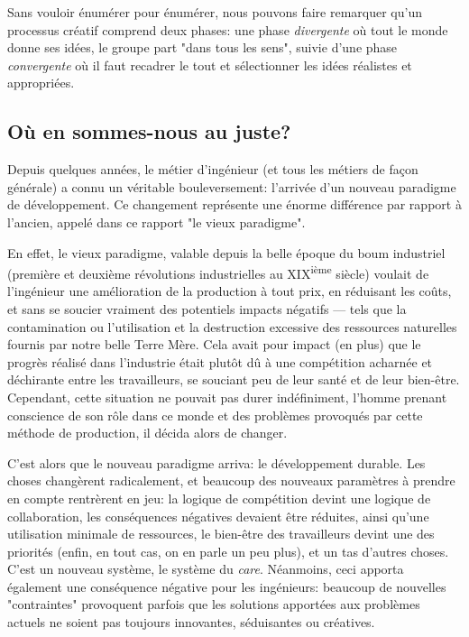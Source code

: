 Sans vouloir énumérer pour énumérer, nous pouvons faire remarquer qu'un processus créatif comprend deux phases: une phase \textit{divergente} où tout le monde donne ses idées, le groupe part "dans tous les sens", suivie d'une phase \textit{convergente} où il faut recadrer le tout et sélectionner les idées réalistes et appropriées.

\subsection{Où en sommes-nous au juste?}

Depuis quelques années, le métier d’ingénieur (et tous les métiers de façon générale) a connu un véritable bouleversement: l'arrivée d'un nouveau paradigme de développement. Ce changement représente une énorme différence par rapport à l'ancien, appelé dans ce rapport "le vieux paradigme". 

En effet, le vieux paradigme, valable depuis la belle époque du boum industriel (première et deuxième révolutions industrielles au XIX\textsuperscript{ième} siècle) voulait de l’ingénieur une amélioration de la production à tout prix, en réduisant les coûts, et sans se soucier vraiment des potentiels impacts négatifs --- tels que la contamination ou l'utilisation et la destruction excessive des ressources naturelles fournis par notre belle Terre Mère. Cela avait pour impact (en plus) que le progrès réalisé dans l'industrie était plutôt dû à une compétition acharnée et déchirante entre les travailleurs, se souciant peu de leur santé et de leur bien-être. Cependant, cette situation ne pouvait pas durer indéfiniment, l'homme prenant conscience de son rôle dans ce monde et des problèmes provoqués par cette méthode de production, il décida alors de changer.

C'est alors que le nouveau paradigme arriva: le développement durable. Les choses changèrent radicalement, et beaucoup des nouveaux paramètres à prendre en compte rentrèrent en jeu: la logique de compétition devint une logique de collaboration, les conséquences négatives devaient être réduites, ainsi qu'une utilisation minimale de ressources, le bien-être des travailleurs devint une des priorités (enfin, en tout cas, on en parle un peu plus), et un tas d'autres choses. C'est un nouveau système, le système du \textit{care}. Néanmoins, ceci apporta également une conséquence négative pour les ingénieurs: beaucoup de nouvelles "contraintes" provoquent parfois que les solutions apportées aux problèmes actuels ne soient pas toujours innovantes, séduisantes ou créatives.


